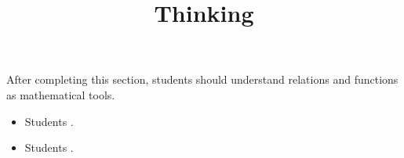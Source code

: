\documentclass{ximera}
\title{Thinking}
\begin{document}
\begin{abstract}
\end{abstract}

\maketitle

\begin{sectionOutcomes}

After completing this section, students should understand relations and functions as mathematical tools. 

\begin{itemize}
\item Students .
\item Students .
\end{itemize}

\end{sectionOutcomes}
\end{document}
